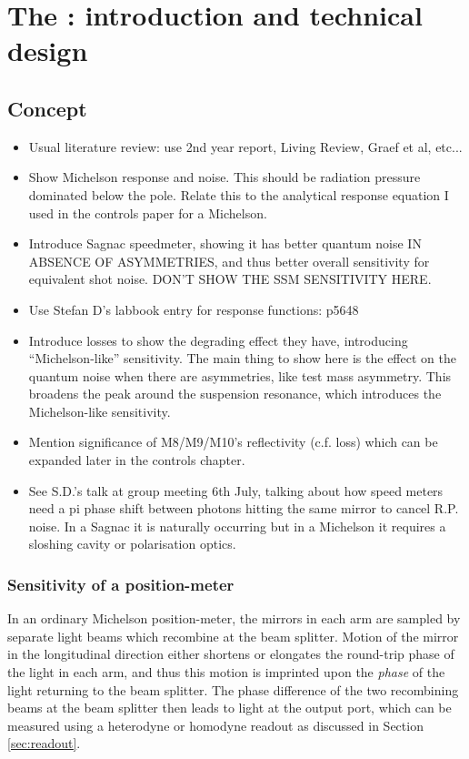 \chapter{\label{c:speedmeter-intro}The \SSMEXPT{}: introduction and technical design}

\section{Concept}
\begin{itemize}
  \item Usual literature review: use 2nd year report, Living Review, Graef et al, etc...
  \item Show Michelson response and noise. This should be radiation pressure dominated below the pole. Relate this to the analytical response equation I used in the controls paper for a Michelson.
  \item Introduce Sagnac speedmeter, showing it has better quantum noise IN ABSENCE OF ASYMMETRIES, and thus better overall sensitivity for equivalent shot noise. DON'T SHOW THE SSM SENSITIVITY HERE.
  \item Use Stefan D's labbook entry for response functions: p5648
  \item Introduce losses to show the degrading effect they have, introducing ``Michelson-like'' sensitivity. The main thing to show here is the effect on the quantum noise when there are asymmetries, like test mass asymmetry. This broadens the peak around the suspension resonance, which introduces the Michelson-like sensitivity.
  \item Mention significance of M8/M9/M10's reflectivity (c.f. loss) which can be expanded later in the controls chapter.
  \item See S.D.'s talk at group meeting 6th July, talking about how speed meters need a pi phase shift between photons hitting the same mirror to cancel R.P. noise. In a Sagnac it is naturally occurring but in a Michelson it requires a sloshing cavity or polarisation optics.
\end{itemize}

\subsection{\label{sec:position-meter-measurement}Sensitivity of a position-meter}
In an ordinary Michelson position-meter, the mirrors in each arm are sampled by separate light beams which recombine at the beam splitter. Motion of the mirror in the longitudinal direction either shortens or elongates the round-trip phase of the light in each arm, and thus this motion is imprinted upon the \emph{phase} of the light returning to the beam splitter. The phase difference of the two recombining beams at the beam splitter then leads to light at the output port, which can be measured using a heterodyne or homodyne readout as discussed in Section\,\ref{sec:readout}.

